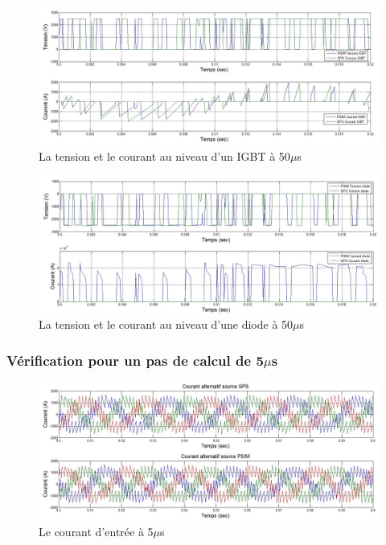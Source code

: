 \documentclass[11pt,letterpaper,final]{report}
\begin{document}
\begin{figure}[htb]
\centering
\includegraphics[scale=0.5]{Fig/AFE3LEVEL/50u/IGBT.jpg}
\caption{La tension et le courant au niveau d'un IGBT à 50$\mu$s}
\label{AF_3_IGBT50}
\end{figure}

\begin{figure}[htb]
\centering
\includegraphics[scale=0.5]{Fig/AFE3LEVEL/50u/DIODE.jpg}
\caption{La tension et le courant au niveau d'une diode à 50$\mu$s}
\label{AF_3_DIODE50}
\end{figure}

\clearpage
\subsubsection{Vérification pour un pas de calcul de 5$\mu$s}

\begin{figure}[htb]
\centering
\includegraphics[scale=0.5]{Fig/AFE3LEVEL/5u/cour_al.jpg}
\caption{Le courant d'entrée à 5$\mu$s}
\label{AF_3_cou5}
\end{figure}
\end{document}
